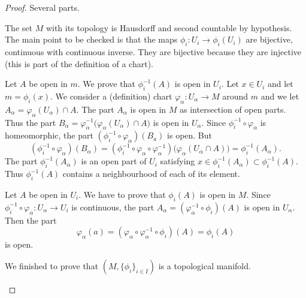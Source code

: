 \begin{proof}
	Several parts.
	\begin{subproof}
		The set \( M\) with its topology is Hausdorff and second countable by hypothesis. The main point to be checked is that the maps \(\phi_i \colon U_i\to \phi_i(U_i)  \) are bijective, continuous with continuous inverse. They are bijective because they are injective (this is part of the definition of a chart).

		\begin{subproof}
			Let \( A\) be open in \( m\). We prove that \( \phi_i^{-1}(A)\) is open in \( U_i\). Let \( x\in U_i\) and let \( m=\phi_i(x)\). We consider a (definition) chart \(\varphi_{\alpha} \colon U_{\alpha}\to M  \) around \( m\) and we let \( A_{\alpha}=\varphi_{\alpha}(U_{\alpha})\cap A\). The part \( A_{\alpha}\) is open in \( M\) as intersection of open parts. Thus the part \( B_{\alpha}=\varphi_{\alpha}^{-1}\big( \varphi_{\alpha}(U_{\alpha})\cap A \big)\) is open in \( U_{\alpha}\). Since \( \phi_i^{-1}\circ\varphi_{\alpha}\) is homeomorphic, the part \( (\phi_i^{-1}\circ\varphi_{\alpha})(B_{a}) \) is open. But
			\begin{equation}
				(\phi_i^{-1}\circ\varphi_{\alpha})(B_{\alpha})=(\phi_i^{-1}\circ\varphi_{\alpha}\circ\varphi_{\alpha}^{-1})\big( \varphi_{\alpha}(U_{\alpha}\cap A) \big)=\phi_i^{-1}(A_{\alpha}).
			\end{equation}
			The part \( \phi_i^{-1}(A_{\alpha}) \) is an open part of \( U_i\) satisfying \( x\in \phi_i^{-1}(A_{\alpha})\subset\phi_i^{-1}(A)\). Thus \( \phi_i^{-1}(A)\) contains a neighbourhood of each of its element.

			Let \( A\) be open in \( U_i\). We have to prove that \( \phi_i(A)\) is open in \( M\). Since \(\phi_i^{-1}\circ\varphi_{\alpha} \colon U_{\alpha}\to U_i  \) is continuous, the part \( A_{\alpha}=(\varphi_{\alpha}^{-1}\circ\phi_i)(A)\) is open in \( U_{\alpha}\). Then the part
			\begin{equation}
				\varphi_{\alpha}(a)=(\varphi_{\alpha}\circ\varphi_{\alpha}^{-1}\circ\phi_i)(A)=\phi_i(A)
			\end{equation}
			is open.
		\end{subproof}
		We finished to prove that \( (M,\{ \phi_i \}_{i\in I})\) is a topological manifold.


\end{subproof}
\end{proof}
